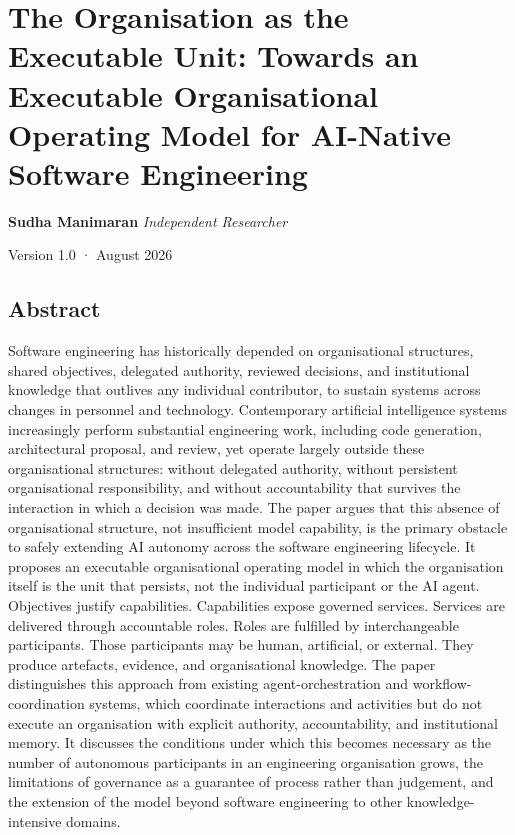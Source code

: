 \documentclass[
  11pt,
]{article}
\author{}
\date{}
\begin{document}
\hypertarget{the-organisation-as-the-executable-unit-towards-an-executable-organisational-operating-model-for-ai-native-software-engineering}{%
\section{The Organisation as the Executable Unit: Towards an Executable
Organisational Operating Model for AI-Native Software
Engineering}\label{the-organisation-as-the-executable-unit-towards-an-executable-organisational-operating-model-for-ai-native-software-engineering}}

\textbf{Sudha Manimaran} \emph{Independent Researcher}

Version 1.0 · August 2026

\hypertarget{abstract}{%
\subsection{Abstract}\label{abstract}}

Software engineering has historically depended on organisational
structures, shared objectives, delegated authority, reviewed decisions,
and institutional knowledge that outlives any individual contributor, to
sustain systems across changes in personnel and technology. Contemporary
artificial intelligence systems increasingly perform substantial
engineering work, including code generation, architectural proposal, and
review, yet operate largely outside these organisational structures:
without delegated authority, without persistent organisational
responsibility, and without accountability that survives the interaction
in which a decision was made. The paper argues that this absence of
organisational structure, not insufficient model capability, is the
primary obstacle to safely extending AI autonomy across the software
engineering lifecycle. It proposes an executable organisational
operating model in which the organisation itself is the unit that
persists, not the individual participant or the AI agent. Objectives
justify capabilities. Capabilities expose governed services. Services
are delivered through accountable roles. Roles are fulfilled by
interchangeable participants. Those participants may be human,
artificial, or external. They produce artefacts, evidence, and
organisational knowledge. The paper distinguishes this approach from
existing agent-orchestration and workflow-coordination systems, which
coordinate interactions and activities but do not execute an
organisation with explicit authority, accountability, and institutional
memory. It discusses the conditions under which this becomes necessary
as the number of autonomous participants in an engineering organisation
grows, the limitations of governance as a guarantee of process rather
than judgement, and the extension of the model beyond software
engineering to other knowledge-intensive domains.
\end{document}
